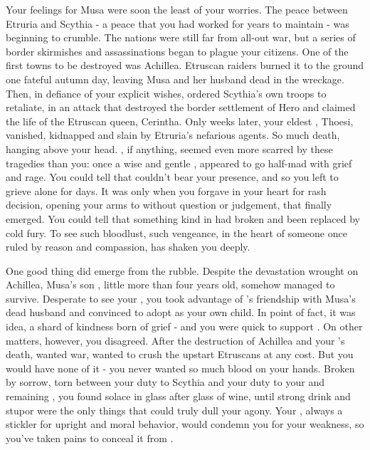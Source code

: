 \documentclass[char]{Kos}
\begin{document}
    Your feelings for Musa were soon the least of your worries. The peace between Etruria and Scythia - a peace that you had worked for years to maintain - was beginning to crumble. The nations were still far from all-out war, but a series of border skirmishes and assassinations began to plague your citizens. One of the first towns to be destroyed was Achillea. Etruscan raiders burned it to the ground one fateful autumn day, leaving Musa and her husband dead in the wreckage. Then, in defiance of your explicit wishes, \cScythiaQueen{\Monarch} \cScythiaQueen{} ordered Scythia's own troops to retaliate, in an attack that destroyed the border settlement of Hero and claimed the life of the Etruscan queen, Cerintha. Only weeks later, your eldest \cFugitive{\offspring}, Thoesi, vanished, kidnapped and slain by Etruria's nefarious agents. So much death, hanging above your head. \cScythiaQueen{}, if anything, seemed even more scarred by these tragedies than you: once a wise and gentle \cScythiaQueen{\human}, \cScythiaQueen{\they} appeared to go half-mad with grief and rage. You could tell that \cScythiaQueen{\they} couldn't bear your presence, and so you left \cScythiaQueen{\them} to grieve alone for days. It was only when you forgave \cScythiaQueen{\them} in your heart for \cScythiaQueen{\their} rash decision, opening your arms to \cScythiaQueen{\them} without question or judgement, that \cScythiaQueen{\they} finally emerged. You could tell that something kind in \cScythiaQueen{\them} had broken and been replaced by cold fury. To see such bloodlust, such vengeance, in the heart of someone once ruled by reason and compassion, has shaken you deeply.

    One good thing did emerge from the rubble. Despite the devastation wrought on Achillea, Musa's son \cWard{}, little more than four years old, somehow managed to survive. Desperate to see your \cWard{\offspring}, you took advantage of \cScythiaQueen{}'s friendship with Musa's dead husband and convinced \cScythiaQueen{\them} to adopt \cWard{} as your own child. In point of fact, it was \cScythiaQueen{\their} idea, a shard of kindness born of grief - and you were quick to support \cScythiaQueen{\them}. On other matters, however, you disagreed. After the destruction of Achillea and your \cFugitive{\offspring}'s death, \cScythiaQueen{} wanted war, wanted to crush the upstart Etruscans at any cost. But you would have none of it - you never wanted so much blood on your hands. Broken by sorrow, torn between your duty to Scythia and your duty to your \cScythiaQueen{\spouse} and remaining \cBride{\offspring}, you found solace in glass after glass of wine, until strong drink and stupor were the only things that could truly dull your agony. Your \cScythiaQueen{\spouse}, always a stickler for upright and moral behavior, would condemn you for your weakness, so you've taken pains to conceal it from \cScythiaQueen{\them}.
\end{document}
